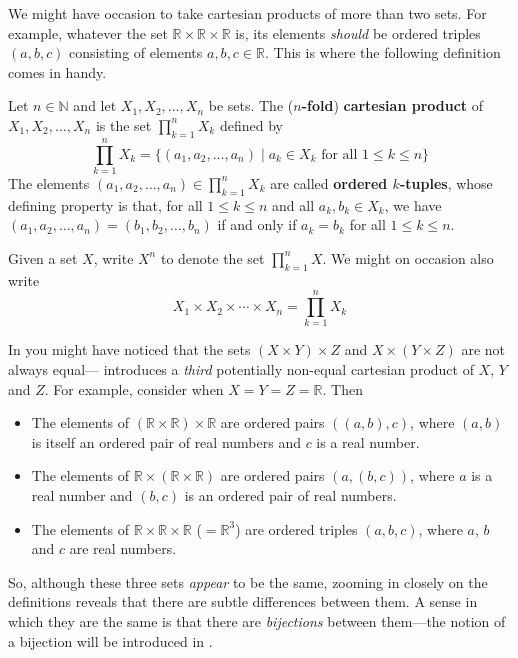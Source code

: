 We might have occasion to take cartesian products of more than two sets. For example, whatever the set $\mathbb{R} \times \mathbb{R} \times \mathbb{R}$ is, its elements \textit{should} be ordered triples $(a,b,c)$ consisting of elements $a,b,c \in \mathbb{R}$. This is where the following definition comes in handy.

\begin{definition}
\label{defCartesianProductNFold}
Let $n \in \mathbb{N}$ and let $X_1, X_2, \dots, X_n$ be sets. The (\textbf{$n$-fold}) \textbf{cartesian product} of $X_1, X_2, \dots, X_n$ is the set $\prod_{k=1}^n X_k$  defined by
\[ \prod_{k=1}^n X_k = \{ (a_1, a_2, \dots, a_n) \mid a_k \in X_k \text{ for all } 1 \le k \le n \} \]
The elements $(a_1, a_2, \dots, a_n) \in \prod_{k=1}^n X_k$ are called \textbf{ordered $k$-tuples}, whose defining property is that, for all $1 \le k \le n$ and all $a_k,b_k \in X_k$, we have $(a_1, a_2, \dots, a_n) = (b_1, b_2, \dots, b_n)$ if and only if $a_k = b_k$ for all $1 \le k \le n$.

Given a set $X$, write $X^n$ to denote the set $\prod_{k=1}^n X$. We might on occasion also write
\[ X_1 \times X_2 \times \cdots \times X_n = \prod_{k=1}^n X_k \]
\end{definition}

\begin{example}
In  you might have noticed that the sets $(X \times Y) \times Z$ and $X \times (Y \times Z)$ are not always equal--- introduces a \textit{third} potentially non-equal cartesian product of $X$, $Y$ and $Z$. For example, consider when $X=Y=Z=\mathbb{R}$. Then
\begin{itemize}
\item The elements of $(\mathbb{R} \times \mathbb{R}) \times \mathbb{R}$ are ordered pairs $((a,b),c)$, where $(a,b)$ is itself an ordered pair of real numbers and $c$ is a real number.
\item The elements of $\mathbb{R} \times (\mathbb{R} \times \mathbb{R})$ are ordered pairs $(a,(b,c))$, where $a$ is a real number and $(b,c)$ is an ordered pair of real numbers.
\item The elements of $\mathbb{R} \times \mathbb{R} \times \mathbb{R}$ ($=\mathbb{R}^3$) are ordered triples $(a,b,c)$, where $a$, $b$ and $c$ are real numbers.
\end{itemize}
So, although these three sets \textit{appear} to be the same, zooming in closely on the definitions reveals that there are subtle differences between them. A sense in which they are the same is that there are \textit{bijections} between them---the notion of a bijection will be introduced in .
\end{example}

